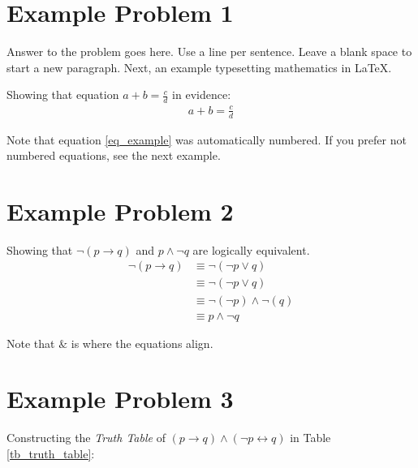 \documentclass[12pt,letterpaper]{article}
\begin{document}
\section*{Example Problem 1}

Answer to the problem goes here.
Use a line per sentence.
Leave a blank space to start a new paragraph. Next, an example typesetting mathematics in \LaTeX .

Showing that equation $a + b = \frac{c}{d}$ in evidence:
\begin{align}
    \label{eq_example}
    a + b = \frac{c}{d}
\end{align}

Note that equation \ref{eq_example} was automatically numbered.
If you prefer not numbered equations, see the next example.

\section*{Example Problem 2}

Showing that $\neg (p \rightarrow q)$ and  $p \wedge \neg q$ are logically equivalent.
\begin{align*}
   \neg (p \rightarrow q)   & \equiv \neg ( \neg p \vee q ) \\ %
                            & \equiv \neg ( \neg p \vee q ) \\
                            & \equiv \neg ( \neg p ) \wedge \neg ( q ) \\
                            & \equiv p \wedge \neg q
\end{align*}

Note that $\&$ is where the equations align.

\section*{Example Problem 3}

Constructing the \emph{Truth Table} of $(p \rightarrow q) \wedge (\neg p \leftrightarrow q)$ in Table \ref{tb_truth_table}:
\end{document}
